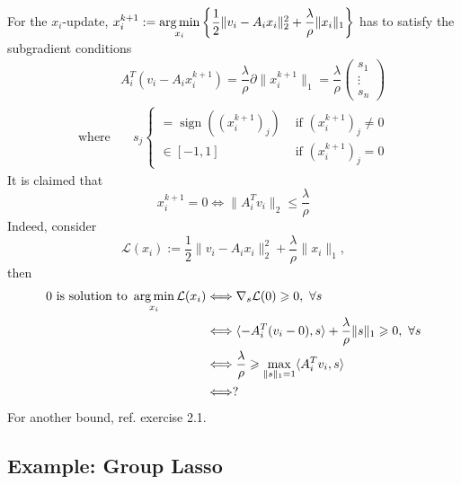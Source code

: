 For the $x_i$-update, $x_i^{k+1} := \operatorname*{arg\,min}\limits_{x_i} \left\{ \dfrac{1}{2} \lVert v_i - A_ix_i \rVert_2^2 + \dfrac{\lambda}{\rho} \lVert x_i \rVert_1 \right\}$ has to satisfy the subgradient conditions
\begin{align*}
    & A_i^T (v_i-A_ix_i^{k+1}) = \dfrac{\lambda}{\rho} \partial \lVert x_i^{k+1} \rVert_1 = \dfrac{\lambda}{\rho} \begin{pmatrix} s_1 \\ \vdots \\ s_n \end{pmatrix} \\
    \text{where} & \quad s_j \begin{cases} = \operatorname{sign}((x_i^{k+1})_j) & \text{ if } (x_i^{k+1})_j \neq 0 \\ \in [-1, 1] & \text{ if } (x_i^{k+1})_j = 0 \end{cases}
\end{align*}
It is claimed that
$$x^{k+1}_i = 0 \Longleftrightarrow \lVert A_i^T v_i \rVert_2 \leqslant \dfrac{\lambda}{\rho}$$
{\color{red}
Indeed, consider
$$\mathcal{L}(x_i) := \dfrac{1}{2} \lVert v_i - A_ix_i \rVert_2^2 + \dfrac{\lambda}{\rho} \lVert x_i \rVert_1,$$
then
\begin{align*}
    0 \text{ is solution to } \operatorname*{arg\,min}_{x_i} \mathcal{L}(x_i) & \Longleftrightarrow \nabla_s \mathcal{L}(0) \geqslant 0, \ \forall s \\
    & \Longleftrightarrow \langle -A_i^T (v_i - 0), s \rangle + \dfrac{\lambda}{\rho} \lVert s \rVert_1 \geqslant 0, \ \forall s \\
    & \Longleftrightarrow \dfrac{\lambda}{\rho} \geqslant \max\limits_{\lVert s \rVert_1=1} \langle A_i^T v_i, s \rangle \\
    & \Longleftrightarrow ?
\end{align*}
}
For another bound, ref. \cite{hastie2019statistical} exercise 2.1.


\subsection{Example: Group Lasso}

